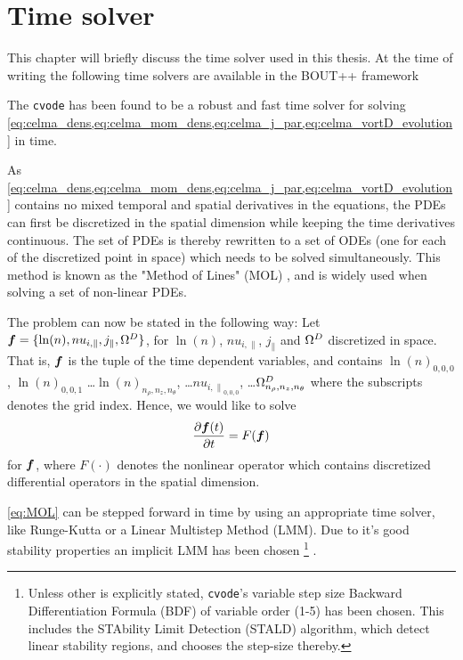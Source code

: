 \section{Time solver}
This chapter will briefly discuss the time solver used in this thesis.
At the time of writing the following time solvers are available in the BOUT++ framework

The \texttt{cvode}\cite{Hindmarsh2012book} has been found to be a robust and fast time solver for solving \cref{eq:celma_dens,eq:celma_mom_dens,eq:celma_j_par,eq:celma_vortD_evolution} in time.

As \cref{eq:celma_dens,eq:celma_mom_dens,eq:celma_j_par,eq:celma_vortD_evolution} contains no mixed temporal and spatial derivatives in the equations, the PDEs can first be discretized in the spatial dimension while keeping the time derivatives continuous.
The set of PDEs is thereby rewritten to a set of ODEs (one for each of the discretized point in space) which needs to be solved simultaneously.
This method is known as the "Method of Lines" (MOL) \cite{Leveque2007book}, and is widely used when solving a set of non-linear PDEs.

The problem can now be stated in the following way:
Let $\boldsymbol{f} = \{\ln(n), nu_{i,\|}, j_\|, \Omega^D\}$, for $\ln(n)$, $nu_{i,\|}$, $j_\|$ and $\Omega^D$ discretized in space.
That is, $\boldsymbol{f}$ is the tuple of the time dependent variables, and contains $\ln(n)_{0,0,0}$, $\ln(n)_{0,0,1}$ \ldots $\ln(n)_{n_\rho,n_z,n_\theta}$, \ldots $nu_{{i,\|}_{0,0,0}}$, \ldots $\Omega^D_{n_\rho,n_z,n_\theta}$ where the subscripts denotes the grid index.
Hence, we would like to solve
%
\begin{align}
    \frac{\partial {\boldsymbol{f}(t)}}{\partial{t}} = F(\boldsymbol{f})
    \label{eq:MOL}
\end{align}
%
for $\boldsymbol{f}$, where $F(\cdot)$ denotes the nonlinear operator which contains discretized differential operators in the spatial dimension.

\cref{eq:MOL} can be stepped forward in time by using an appropriate time solver, like Runge-Kutta or a Linear Multistep Method (LMM).
Due to it's good stability properties \cite{Leveque2007book} an implicit LMM has been chosen%
\footnote{
    Unless other is explicitly stated, \texttt{cvode}'s variable step size Backward Differentiation Formula (BDF) of variable order (1-5) has been chosen.
    This includes the STAbility Limit Detection (STALD) algorithm, which detect linear stability regions, and chooses the step-size thereby.
}
%
.


